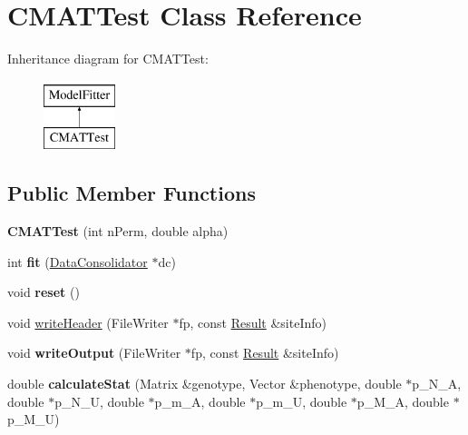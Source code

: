 \hypertarget{classCMATTest}{\section{C\-M\-A\-T\-Test Class Reference}
\label{classCMATTest}
}
Inheritance diagram for C\-M\-A\-T\-Test\-:\begin{figure}[H]
\begin{center}
\leavevmode
\includegraphics[height=2.000000cm]{classCMATTest}
\end{center}
\end{figure}
\subsection*{Public Member Functions}
\begin{DoxyCompactItemize}
\item 
\hypertarget{classCMATTest_a7a7de6f2ddc5efd43af959104a69e7d0}{{\bfseries C\-M\-A\-T\-Test} (int n\-Perm, double alpha)}\label{classCMATTest_a7a7de6f2ddc5efd43af959104a69e7d0}

\item 
\hypertarget{classCMATTest_a1655b4a7dfda01a1b1312e6a209e3eb8}{int {\bfseries fit} (\hyperlink{classDataConsolidator}{Data\-Consolidator} $\ast$dc)}\label{classCMATTest_a1655b4a7dfda01a1b1312e6a209e3eb8}

\item 
\hypertarget{classCMATTest_a725028ef42f405dfe485feec34ce4004}{void {\bfseries reset} ()}\label{classCMATTest_a725028ef42f405dfe485feec34ce4004}

\item 
void \hyperlink{classCMATTest_a7d11a67d555d8cb2fa21cdab61bf1f01}{write\-Header} (File\-Writer $\ast$fp, const \hyperlink{classResult}{Result} \&site\-Info)
\item 
\hypertarget{classCMATTest_a44e1f8eba1028156336ebc83900bc71f}{void {\bfseries write\-Output} (File\-Writer $\ast$fp, const \hyperlink{classResult}{Result} \&site\-Info)}\label{classCMATTest_a44e1f8eba1028156336ebc83900bc71f}

\item 
\hypertarget{classCMATTest_a66933f0ca26498ca1f4a401093102b96}{double {\bfseries calculate\-Stat} (Matrix \&genotype, Vector \&phenotype, double $\ast$p\-\_\-\-N\-\_\-\-A, double $\ast$p\-\_\-\-N\-\_\-\-U, double $\ast$p\-\_\-m\-\_\-\-A, double $\ast$p\-\_\-m\-\_\-\-U, double $\ast$p\-\_\-\-M\-\_\-\-A, double $\ast$p\-\_\-\-M\-\_\-\-U)}\label{classCMATTest_a66933f0ca26498ca1f4a401093102b96}

\end{DoxyCompactItemize}
